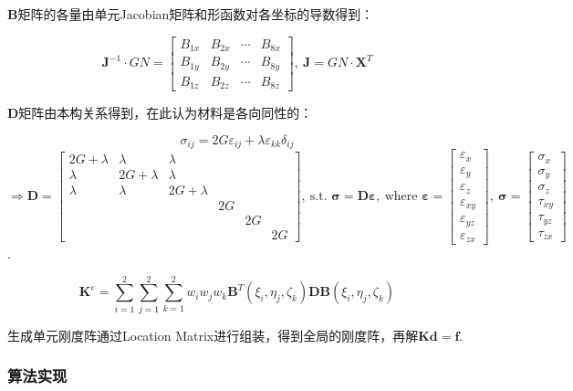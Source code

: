 \documentclass[UTF8]{ctexbook}
\begin{document}
$\boldsymbol{B}$矩阵的各量由单元Jacobian矩阵和形函数对各坐标的导数得到：


\[
\boldsymbol{J}^{-1}\cdot GN=\begin{bmatrix}B_{1x} & B_{2x} & \cdots & B_{8x}\\
B_{1y} & B_{2y} & \cdots & B_{8y}\\
B_{1z} & B_{2z} & \cdots & B_{8z}
\end{bmatrix},\ \boldsymbol{J}=GN\cdot\boldsymbol{X}^{T}
\]



$\boldsymbol{D}$矩阵由本构关系得到，在此认为材料是各向同性的：


\[
\sigma_{ij}=2G\varepsilon_{ij}+\lambda\varepsilon_{kk}\delta_{ij}
\]
$\Rightarrow\boldsymbol{D}=\begin{bmatrix}2G+\lambda & \lambda & \lambda\\
\lambda & 2G+\lambda & \lambda\\
\lambda & \lambda & 2G+\lambda\\
 &  &  & 2G\\
 &  &  &  & 2G\\
 &  &  &  &  & 2G
\end{bmatrix},\ \text{s.t. }\boldsymbol{\sigma}=\boldsymbol{D\varepsilon},\ \text{where }\boldsymbol{\varepsilon}=\begin{bmatrix}\varepsilon_{x}\\
\varepsilon_{y}\\
\varepsilon_{z}\\
\varepsilon_{xy}\\
\varepsilon_{yz}\\
\varepsilon_{zx}
\end{bmatrix},\ \boldsymbol{\sigma}=\begin{bmatrix}\sigma_{x}\\
\sigma_{y}\\
\sigma_{z}\\
\tau_{xy}\\
\tau_{yz}\\
\tau_{zx}
\end{bmatrix}$.


\[
\boldsymbol{K}^{e}=\sum_{i=1}^{2}\sum_{j=1}^{2}\sum_{k=1}^{2}w_{i}w_{j}w_{k}\boldsymbol{B}^{T}(\xi_{i},\eta_{j},\zeta_{k})\boldsymbol{DB}(\xi_{i},\eta_{j},\zeta_{k})
\]



生成单元刚度阵通过Location Matrix进行组装，得到全局的刚度阵，再解$\boldsymbol{Kd=f}$.


\subsubsection{算法实现}
\end{document}
